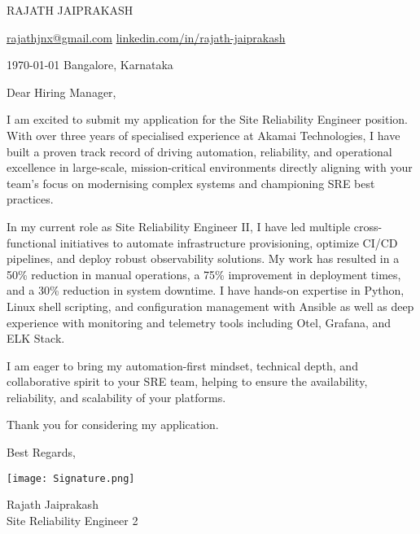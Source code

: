 \documentclass[12pt]{letter}
\begin{document}
\AddToShipoutPictureBG{%
\color{gr}
\AtPageUpperLeft{\rule[-1.3in]{\paperwidth}{1.3in}}
}

\begin{center}
{\fontsize{28}{0}\selectfont\scshape RAJATH JAIPRAKASH}

\href{mailto:rajathjnx@gmail.com}{\faEnvelope\enspace rajathjnx@gmail.com}\hfill
\href{https://linkedin.com/in/rajath-jaiprakash}{\faLinkedin\enspace linkedin.com/in/rajath-jaiprakash}\hfill
\href{tel:9900852849}{\faPhone{}}
\end{center}

\vspace{0.2in}

\today
\newline
Bangalore, Karnataka
\newline

\vspace{-0.1in}
Dear Hiring Manager,
\newline

\vspace{-0.1in}\setlength\parindent{24pt}
I am excited to submit my application for the Site Reliability Engineer position. With over three years of specialised experience at Akamai Technologies, I have built a proven track record of driving automation, reliability, and operational excellence in large-scale, mission-critical environments directly aligning with your team's focus on modernising complex systems and championing SRE best practices.

In my current role as Site Reliability Engineer II, I have led multiple cross-functional initiatives to automate infrastructure provisioning, optimize CI/CD pipelines, and deploy robust observability solutions. My work has resulted in a 50\% reduction in manual operations, a 75\% improvement in deployment times, and a 30\% reduction in system downtime. I have hands-on expertise in Python, Linux shell scripting, and configuration management with Ansible as well as deep experience with monitoring and telemetry tools including Otel, Grafana, and ELK Stack.

I am eager to bring my automation-first mindset, technical depth, and collaborative spirit to your SRE team, helping to ensure the availability, reliability, and scalability of your platforms.

Thank you for considering my application.

\vspace{0.1in}
\vfill

\begin{flushright}
Best Regards,

\vspace{-0.1in}\texttt{[image: Signature.png]}\vspace{-0.1in}

Rajath Jaiprakash \\
Site Reliability Engineer 2
\end{flushright}
\end{document}
